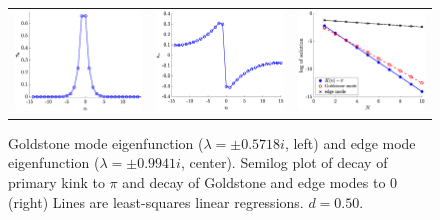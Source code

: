 \documentclass[12pt,reqno]{amsart}
\begin{document}
\begin{figure}[H]
	\begin{center}
	\begin{tabular}{ccc}
	\includegraphics[width=5cm]{1kinkgoldstonemode.eps} &
	\includegraphics[width=5cm]{1kinkedgemode.eps} &
	\includegraphics[width=5cm]{decayplot.eps}
	\end{tabular}
	\end{center}
	\caption{Goldstone mode eigenfunction ($\lambda = \pm 0.5718 i$, left) and edge mode eigenfunction ($\lambda = \pm 0.9941 i$, center). Semilog plot of decay of primary kink to $\pi$ and decay of Goldstone and edge modes to 0 (right) Lines are least-squares linear regressions. $d = 0.50$. }
	\label{fig:kinkeig}
\end{figure}
\end{document}
